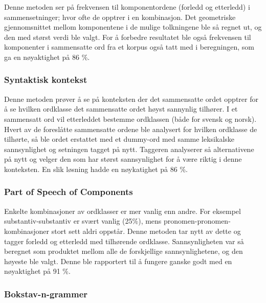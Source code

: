 Denne metoden ser på frekvensen til komponentordene (forledd og etterledd) i sammensetninger; hvor ofte de opptrer i en kombinasjon. Det geometriske gjennomsnittet mellom komponentene i de mulige tolkningene ble så regnet ut, og den med størst verdi ble valgt. For å forbedre resultatet ble også frekvensen til komponenter i sammensatte ord fra et korpus også tatt med i beregningen, som ga en nøyaktighet på 86 \%.

\subsubsection{Syntaktisk kontekst}

Denne metoden prøver å se på konteksten der det sammensatte ordet opptrer for å se hvilken ordklasse det sammensatte ordet høyst sannynlig tilhører. I et sammensatt ord vil etterleddet bestemme ordklassen (både for svensk og norsk). Hvert av de foreslåtte sammensatte ordene ble analysert for hvilken ordklasse de tilhørte, så ble ordet erstattet med et dummy-ord med samme leksikalske sannsynlighet og setningen tagget på nytt. Taggeren analyserer så alternativene på nytt og velger den som har størst sannsynlighet for å være riktig i denne konteksten. En slik løsning hadde en nøykatighet på 86 \%.

\subsubsection{Part of Speech of Components}

Enkelte kombinasjoner av ordklasser er mer vanlig enn andre. For eksempel substantiv-substantiv er svært vanlig (25\%), mens pronomen-pronomen-kombinasjoner stort sett aldri oppstår. Denne metoden tar nytt av dette og tagger forledd og etterledd med tilhørende ordklasse. Sannsynligheten var så beregnet som produktet mellom alle de forskjellige sannsynlighetene, og den høyeste ble valgt. Denne ble rapportert til å fungere ganske godt med en nøyaktighet på 91 \%.

\subsubsection{Bokstav-n-grammer}

